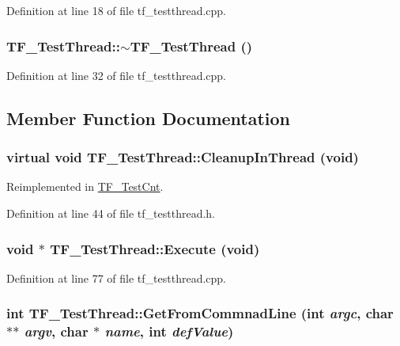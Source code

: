 Definition at line 18 of file tf\_\-testthread.cpp.\hypertarget{classTF__TestThread_a98193a8f032be71f6722230a528cb497}{
\subsubsection[{$\sim$TF\_\-TestThread}]{\setlength{\rightskip}{0pt plus 5cm}TF\_\-TestThread::$\sim$TF\_\-TestThread ()}}
\label{classTF__TestThread_a98193a8f032be71f6722230a528cb497}


Definition at line 32 of file tf\_\-testthread.cpp.

\subsection{Member Function Documentation}
\hypertarget{classTF__TestThread_a36cfb1a6da55b938b5634ac86adbae2f}{
\subsubsection[{CleanupInThread}]{\setlength{\rightskip}{0pt plus 5cm}virtual void TF\_\-TestThread::CleanupInThread (void)}}
\label{classTF__TestThread_a36cfb1a6da55b938b5634ac86adbae2f}


Reimplemented in \hyperlink{classTF__TestCnt_a95c7a76a1fe574d1ed260a07f9469501}{TF\_\-TestCnt}.

Definition at line 44 of file tf\_\-testthread.h.\hypertarget{classTF__TestThread_aac0ee4d59a3fa57e93ad2fa33644b377}{
\subsubsection[{Execute}]{\setlength{\rightskip}{0pt plus 5cm}void $\ast$ TF\_\-TestThread::Execute (void)}}
\label{classTF__TestThread_aac0ee4d59a3fa57e93ad2fa33644b377}


Definition at line 77 of file tf\_\-testthread.cpp.\hypertarget{classTF__TestThread_a3cd8bd0134a8c180c885e7fb19cc9b3c}{
\subsubsection[{GetFromCommnadLine}]{\setlength{\rightskip}{0pt plus 5cm}int TF\_\-TestThread::GetFromCommnadLine (int {\em argc}, \/  char $\ast$$\ast$ {\em argv}, \/  char $\ast$ {\em name}, \/  int {\em defValue})}}
\label{classTF__TestThread_a3cd8bd0134a8c180c885e7fb19cc9b3c}


